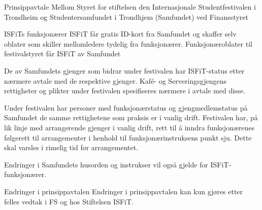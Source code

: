 \begin{instruks*}{Prinsippavtale Mellom Styret for stiftelsen den Internasjonale Studentfestivalen i
        Trondheim og Studentersamfundet i Trondhjem (Samfundet) ved Finansstyret}
\begin{instruksledd}{ISFiTs funksjonærer}
        ISFiT får gratis ID-kort fra Samfundet og skaffer selv oblater som skiller mellomledere tydelig fra
        funksjonærer.
        Funksjonæroblater til festivalstyret får ISFiT av Samfundet

        De av Samfundets gjenger som bidrar under festivalen har ISFiT-status etter nærmere avtale med de
        respektive
        gjenger. Kaf\'e- og Serveringsgjengens rettigheter og plikter under festivalen spesifiseres nærmere
        i avtale med
        disse.

        Under festivalen har personer med funksjonærstatus og gjengmedlemstatus på Samfundet de samme
        rettighetene som
        praksis er i vanlig drift. Festivalen har, på lik linje med arrangerende gjenger i vanlig drift,
        rett til å inndra
        funksjonærenes følgerett til arrangementer i henhold til funksjonærinstruksens punkt sju. Dette skal
        varsles i rimelig
        tid før arrangementet.

        Endringer i Samfundets husorden og instrukser vil også gjelde for ISFiT-funksjonærer.
    \end{instruksledd}


    \begin{instruksledd}{Endringer i prinsippavtalen}
        Endringer i prinsippavtalen kan kun gjøres etter felles vedtak i FS og hos Stiftelsen ISFiT.
    \end{instruksledd} 


\end{instruks*}


